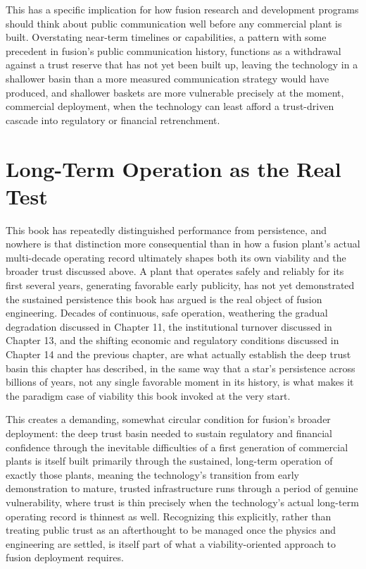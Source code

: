 This has a specific implication for how fusion research and development programs should think about public communication well before any commercial plant is built. Overstating near-term timelines or capabilities, a pattern with some precedent in fusion's public communication history, functions as a withdrawal against a trust reserve that has not yet been built up, leaving the technology in a shallower basin than a more measured communication strategy would have produced, and shallower baskets are more vulnerable precisely at the moment, commercial deployment, when the technology can least afford a trust-driven cascade into regulatory or financial retrenchment.

\section{Long-Term Operation as the Real Test}

This book has repeatedly distinguished performance from persistence, and nowhere is that distinction more consequential than in how a fusion plant's actual multi-decade operating record ultimately shapes both its own viability and the broader trust discussed above. A plant that operates safely and reliably for its first several years, generating favorable early publicity, has not yet demonstrated the sustained persistence this book has argued is the real object of fusion engineering. Decades of continuous, safe operation, weathering the gradual degradation discussed in Chapter 11, the institutional turnover discussed in Chapter 13, and the shifting economic and regulatory conditions discussed in Chapter 14 and the previous chapter, are what actually establish the deep trust basin this chapter has described, in the same way that a star's persistence across billions of years, not any single favorable moment in its history, is what makes it the paradigm case of viability this book invoked at the very start.

This creates a demanding, somewhat circular condition for fusion's broader deployment: the deep trust basin needed to sustain regulatory and financial confidence through the inevitable difficulties of a first generation of commercial plants is itself built primarily through the sustained, long-term operation of exactly those plants, meaning the technology's transition from early demonstration to mature, trusted infrastructure runs through a period of genuine vulnerability, where trust is thin precisely when the technology's actual long-term operating record is thinnest as well. Recognizing this explicitly, rather than treating public trust as an afterthought to be managed once the physics and engineering are settled, is itself part of what a viability-oriented approach to fusion deployment requires.

